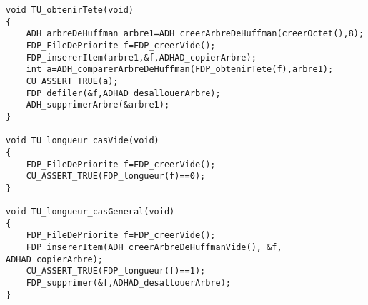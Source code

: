\begin{verbatim}
void TU_obtenirTete(void)
{
	ADH_arbreDeHuffman arbre1=ADH_creerArbreDeHuffman(creerOctet(),8);
	FDP_FileDePriorite f=FDP_creerVide();
  	FDP_insererItem(arbre1,&f,ADHAD_copierArbre);
	int a=ADH_comparerArbreDeHuffman(FDP_obtenirTete(f),arbre1);
	CU_ASSERT_TRUE(a);
	FDP_defiler(&f,ADHAD_desallouerArbre);
	ADH_supprimerArbre(&arbre1);
}

void TU_longueur_casVide(void)
{
	FDP_FileDePriorite f=FDP_creerVide();
	CU_ASSERT_TRUE(FDP_longueur(f)==0);
}

void TU_longueur_casGeneral(void)
{
	FDP_FileDePriorite f=FDP_creerVide();
	FDP_insererItem(ADH_creerArbreDeHuffmanVide(), &f, ADHAD_copierArbre);
	CU_ASSERT_TRUE(FDP_longueur(f)==1);
	FDP_supprimer(&f,ADHAD_desallouerArbre);
}

\end{verbatim}

 
